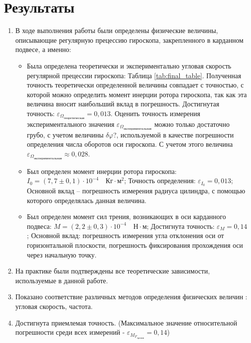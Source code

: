 \documentclass[12pt,a4paper]{article}
\begin{document}
\section{Результаты}
\begin{enumerate}
	\item В ходе выполнения работы были определены физические величины, описывающие регулярную прецессию гироскопа, закрепленного в карданном подвесе, а именно:
		\begin{itemize}
			\item Была определена теоретически и экспериментально угловая скорость регулярной прецессии гироскопа: Таблица \ref{tab:final_table}. Полученная точность теоретически определенной величины совпадает с точностью, с которой можно определить момент инерции ротора гироскопа, так как эта величина вносит наибольший вклад в погрешность. Достигнутая точность: $\varepsilon_{\Omega_{\text{теоретическая}}} = 0,013$. Оценить точность измерения экспериментального значения $\varepsilon_{\Omega_{\text{экспериментальная}}}$ можно только достаточно грубо, с учетом величины $\delta \varphi$?, используемой в качестве погрешности определения числа оборотов оси гироскопа. С учетом этого величина $\varepsilon_{\Omega_{\text{экспериментальная}}} \approx 0,028$.
			\item Был определен момент инерции ротора гироскопа: $I_{0} = \left( 7,7 \pm 0,1 \right) \cdot 10^{-4}\quad \text{Кг} \cdot \text{м}^{2}$; Точность определения: $\varepsilon_{I_{0}} = 0,013$; Основной вклад -- погрешность измерения радиуса цилиндра, с помощью которого определялась данная величина.
			\item Был определен момент сил трения, возникающих в оси карданного подвеса: $M = (2,2 \pm 0,3)\cdot 10^{-4}\quad \text{Н}\cdot\text{м}$; Достигнута точность:  $\varepsilon_{M} = 0,14$; Основной вклад: погрешность измерения угла отклонения оси от горизонтальной плоскости, погрешность фиксирования прохождения оси через начальную точку.
		\end{itemize}
	\item На практике были подтверждены все теоретические зависимости, используемые в данной работе.
	\item Показано соответствие различных методов определения физических величин : угловая скорость, частота.
	\item Достигнута приемлемая точность. (Максимальное значение относительной погрешности среди всех измерений - $\varepsilon_{M_{F_{\text{трения}}}} = 0,14$)
\end{enumerate}
\end{document}
